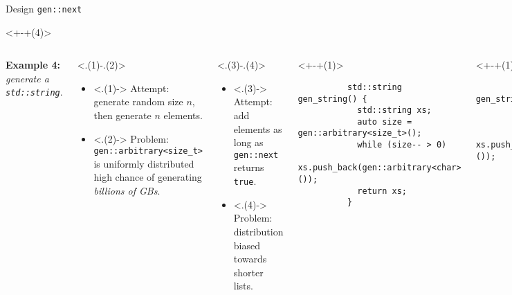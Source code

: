 \begin{frame}[fragile,t]{\halcheck{} \textemdash{} Design \textemdash{} \texttt{gen::next}}
  \begin{onlyenv}<+-+(4)>
    \begin{columns}[T]
      \textbf{Example 4:} \emph{generate a \texttt{std::string}}.

      \begin{onlyenv}<.(1)-.(2)>
        \begin{itemize}
          \item<.(1)-> Attempt: generate random size $n$, then generate $n$ elements.
          \item<.(2)-> Problem: \texttt{gen::arbitrary<size_t>} is uniformly distributed \textemdash{} high chance of generating \emph{billions of GBs}.
        \end{itemize}
      \end{onlyenv}

      \begin{onlyenv}<.(3)-.(4)>
        \begin{itemize}
          \item<.(3)-> Attempt: add elements as long as \texttt{gen::next} returns \texttt{true}.
          \item<.(4)-> Problem: distribution biased towards shorter lists.
        \end{itemize}
      \end{onlyenv}

      \begin{onlyenv}<+-+(1)>
        \begin{verbatim}
          std::string gen_string() {
            std::string xs;
            auto size = gen::arbitrary<size_t>();
            while (size-- > 0)
              xs.push_back(gen::arbitrary<char>());
            return xs;
          }
        \end{verbatim}
        \only<+>{}
      \end{onlyenv}

      \begin{onlyenv}<+-+(1)>
        \begin{verbatim}
          std::string gen_string() {
            std::string xs;
            while (gen::next())
              xs.push_back(gen::arbitrary<char>());
            return xs;
          }
        \end{verbatim}
        \only<+>{}
      \end{onlyenv}

    \end{columns}
  \end{onlyenv}
\end{frame}

